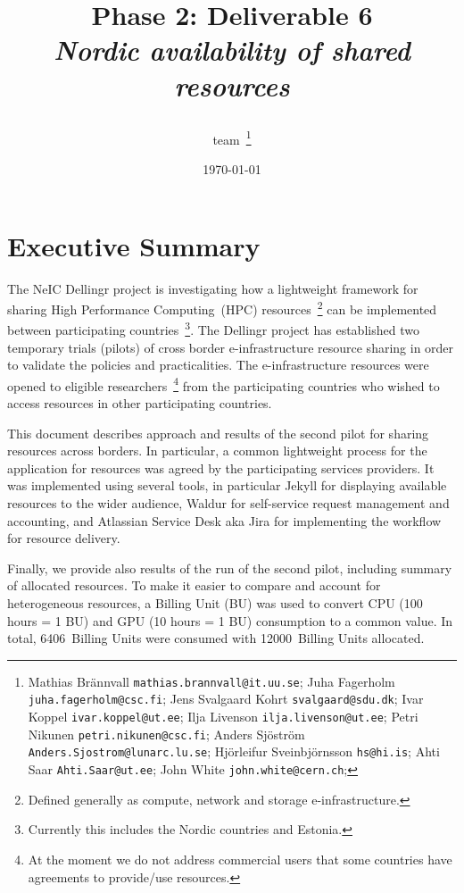 \documentclass{article}
\title{
{\bf \dell Phase 2: Deliverable 6} \\
{\it Nordic availability of shared resources}
\author{\dell team~\footnote{ %
Mathias Br{\"a}nnvall {\tt mathias.brannvall@it.uu.se};
Juha Fagerholm {\tt juha.fagerholm@csc.fi};
Jens Svalgaard Kohrt {\tt svalgaard@sdu.dk};
Ivar Koppel {\tt ivar.koppel@ut.ee};
Ilja Livenson {\tt ilja.livenson@ut.ee};
Petri Nikunen {\tt petri.nikunen@csc.fi};
Anders Sj{\"o}str{\"o}m {\tt Anders.Sjostrom@lunarc.lu.se};
Hj{\"o}rleifur Sveinbj{\"o}rnsson {\tt hs@hi.is};
Ahti Saar {\tt Ahti.Saar@ut.ee};
John White {\tt john.white@cern.ch};
}}}
\date{\today}
\newcommand{\dell}{Dellingr\xspace}
\newcommand{\einfra}{e-infrastructure\xspace}
\newcommand{\BUcons}{6406\xspace}
\newcommand{\BUalloc}{12000\xspace} %
\begin{document}
\pagestyle{fancy}
\lhead{{\bf \dell Project}}

\maketitle

\newpage
\tableofcontents
\newpage

\section{Executive Summary}
\label{sec-exec-summ}

The NeIC \dell project is investigating how a lightweight framework for sharing High Performance Computing~(HPC) resources~\footnote{Defined generally as compute, network and storage \einfra.} can be implemented between participating countries~\footnote{Currently this includes the Nordic countries and Estonia.}.
The \dell project has established two temporary trials (pilots) of cross border \einfra resource sharing in order to validate the policies and practicalities. 
The \einfra resources were opened to eligible researchers~\footnote{At the moment we do not address commercial users that some countries have agreements to provide/use resources.} from the participating countries who wished to access resources in other participating countries.

This document describes approach and results of the second pilot
for sharing resources across borders. 
In particular, a common lightweight process for the application for resources was agreed by the participating services providers. 
It was implemented using several tools, in particular Jekyll for displaying available resources to the wider audience, Waldur for self-service request management and accounting, and Atlassian Service Desk aka Jira for implementing the workflow for resource delivery.

Finally, we provide also results of the run of the second pilot, including summary of allocated resources. 
To make it easier to compare and account for heterogeneous resources, a Billing Unit (BU) was used to convert CPU (100 hours = 1 BU) and GPU (10 hours = 1 BU) consumption to a common value. 
In total, \BUcons~Billing Units were consumed with \BUalloc~Billing Units allocated.
\end{document}
